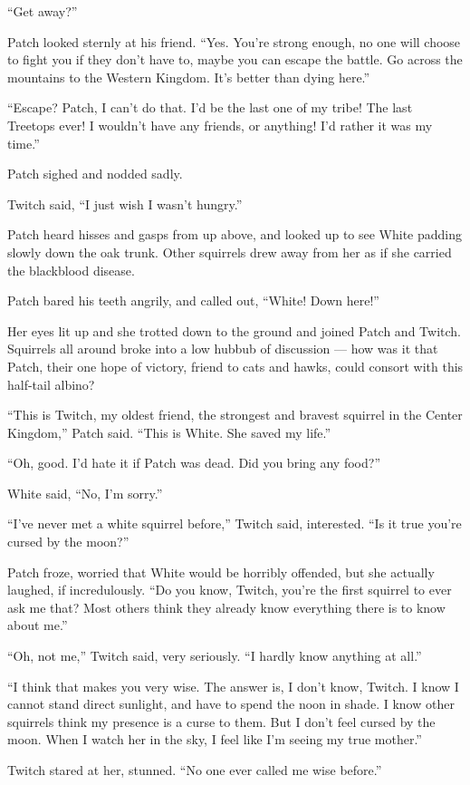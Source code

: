 \documentclass[12pt]{memoir}
\begin{document}
“Get away?”

Patch looked sternly at his friend. “Yes. You’re strong enough, no one
will choose to fight you if they don’t have to, maybe you can escape
the battle. Go across the mountains to the Western Kingdom. It’s
better than dying here.”

“Escape? Patch, I can’t do that. I’d be the last one of my tribe! The
last Treetops ever! I wouldn’t have any friends, or anything! I’d
rather it was my time.”

Patch sighed and nodded sadly.

Twitch said, “I just wish I wasn’t hungry.”

Patch heard hisses and gasps from up above, and looked up to see White
padding slowly down the oak trunk. Other squirrels drew away from her
as if she carried the blackblood disease.

Patch bared his teeth angrily, and called out, “White! Down here!”

Her eyes lit up and she trotted down to the ground and joined Patch
and Twitch. Squirrels all around broke into a low hubbub of discussion
— how was it that Patch, their one hope of victory, friend to cats and
hawks, could consort with this half-tail albino?

“This is Twitch, my oldest friend, the strongest and bravest squirrel
in the Center Kingdom,” Patch said. “This is White. She saved my
life.”

“Oh, good. I’d hate it if Patch was dead. Did you bring any food?”

White said, “No, I’m sorry.”

“I’ve never met a white squirrel before,” Twitch said, interested. “Is
it true you’re cursed by the moon?”

Patch froze, worried that White would be horribly offended, but she
actually laughed, if incredulously. “Do you know, Twitch, you’re the
first squirrel to ever ask me that? Most others think they already
know everything there is to know about me.”

“Oh, not me,” Twitch said, very seriously. “I hardly know anything at
all.”

“I think that makes you very wise. The answer is, I don’t know,
Twitch. I know I cannot stand direct sunlight, and have to spend the
noon in shade. I know other squirrels think my presence is a curse to
them. But I don’t feel cursed by the moon. When I watch her in the
sky, I feel like I’m seeing my true mother.”

Twitch stared at her, stunned. “No one ever called me wise before.”
\end{document}
